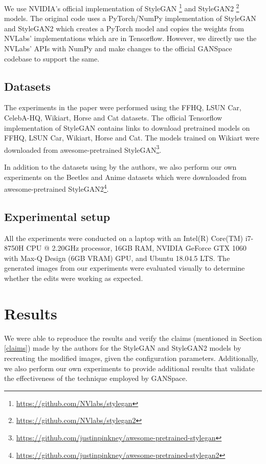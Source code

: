 We use NVIDIA's official implementation of StyleGAN \footnote{\url{https://github.com/NVlabs/stylegan}} and StyleGAN2 \footnote{\url{https://github.com/NVlabs/stylegan2}} models.
The original code uses a PyTorch/NumPy implementation of StyleGAN and StyleGAN2 which creates a PyTorch model and copies the weights from NVLabs' implementations which are in Tensorflow. However, we directly use the NVLabs' APIs with NumPy and make changes to the official GANSpace codebase to support the same.

\subsection{Datasets}

The experiments in the paper were performed using the FFHQ, LSUN Car, CelebA-HQ, Wikiart, Horse and Cat datasets. The official Tensorflow implementation of StyleGAN contains links to download pretrained models on FFHQ, LSUN Car, Wikiart, Horse and Cat. The models trained on Wikiart were downloaded from awesome-pretrained StyleGAN\footnote{\url{https://github.com/justinpinkney/awesome-pretrained-stylegan}}.

In addition to the datasets using by the authors, we also perform our own experiments on the Beetles and Anime datasets which were downloaded from awesome-pretrained StyleGAN2\footnote{\url{https://github.com/justinpinkney/awesome-pretrained-stylegan2}}.


\subsection{Experimental setup}

All the experiments were conducted on a laptop with an Intel(R) Core(TM) i7-8750H CPU @ 2.20GHz processor, 16GB RAM, NVIDIA GeForce GTX 1060 with Max-Q Design (6GB VRAM) GPU, and Ubuntu 18.04.5 LTS. The generated images from our experiments were evaluated visually to determine whether the edits were working as expected.

\section{Results}

We were able to reproduce the results and verify the claims (mentioned in Section \ref{claims}) made by the authors for the StyleGAN and StyleGAN2 models by recreating the modified images, given the configuration parameters. Additionally, we also perform our own experiments to provide additional results that validate the effectiveness of the technique employed by GANSpace.


